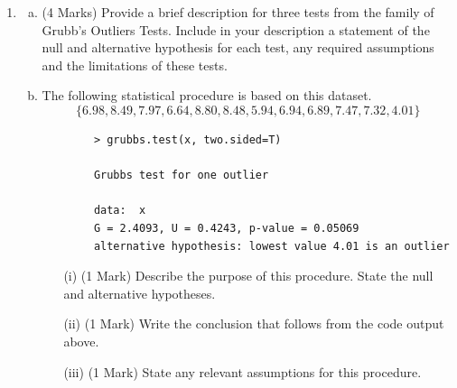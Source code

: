 \documentclass[a4paper,12pt]{article}
\begin{document}
\begin{enumerate}
\item 
\begin{enumerate}[(a)]
\item (4 Marks) Provide a brief description for three tests from the family of Grubb's Outliers Tests. Include in your description a statement of the null and alternative hypothesis for each test, any required assumptions and the limitations of these tests.			
\medskip
\item The following statistical procedure is based on this dataset.
\[\{6.98, 8.49, 7.97, 6.64,
			8.80, 8.48, 5.94, 6.94,
			6.89, 7.47, 7.32, 4.01\}	\]
	
	\begin{framed}
		
		\begin{verbatim}
		> grubbs.test(x, two.sided=T)
		
		Grubbs test for one outlier
		
		data:  x
		G = 2.4093, U = 0.4243, p-value = 0.05069
		alternative hypothesis: lowest value 4.01 is an outlier
		\end{verbatim}
	\end{framed}
	
	\begin{itemize}
		\item[(i)] (1 Mark) Describe the purpose of this procedure. State the null and alternative hypotheses. 
		\item[(ii)] (1 Mark) Write the conclusion that follows from the code output above.
		\item[(iii)] (1 Mark) State any relevant assumptions for this procedure.
	\end{itemize}
\medskip


\end{enumerate}
\end{enumerate}
\end{document}
